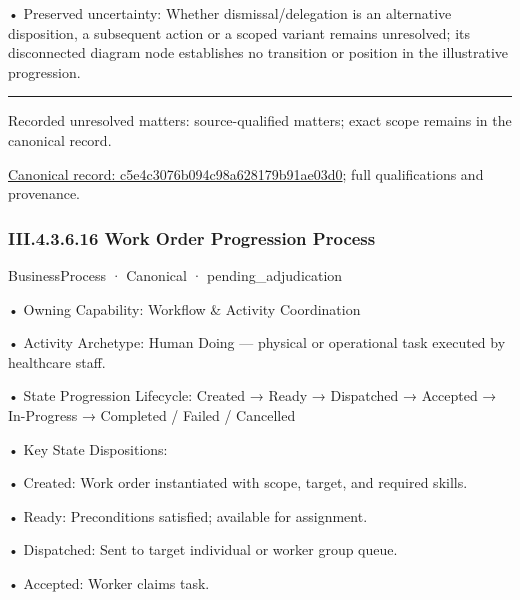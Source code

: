 •
Preserved uncertainty: Whether dismissal/delegation is an alternative disposition, a subsequent action or a scoped variant remains unresolved; its disconnected diagram node establishes no transition or position in the illustrative progression.



\medskip\hrule\medskip

{\small Recorded unresolved matters: source-qualified matters; exact scope remains in the canonical record.}\par
{\footnotesize \href{../../../../../../../../continuum/business/business-process/c5e4c3076b094c98a628179b91ae03d0.md}{Canonical record: c5e4c3076b094c98a628179b91ae03d0}; full qualifications and provenance.}\par
\subsubsection*{III.4.3.6.16 Work Order Progression Process}
\label{navigation:III.4.3.6.16}

\label{element:73fbbe4e027b4805809fad430e791eba}
{\small BusinessProcess · Canonical · pending\_adjudication}\par

•
Owning Capability: Workflow \& Activity Coordination



•
Activity Archetype: Human Doing — physical or operational task executed by healthcare staff.



•
State Progression Lifecycle: Created → Ready → Dispatched → Accepted → In-Progress → Completed / Failed / Cancelled



•
Key State Dispositions:



•
Created: Work order instantiated with scope, target, and required skills.



•
Ready: Preconditions satisfied; available for assignment.



•
Dispatched: Sent to target individual or worker group queue.



•
Accepted: Worker claims task.



